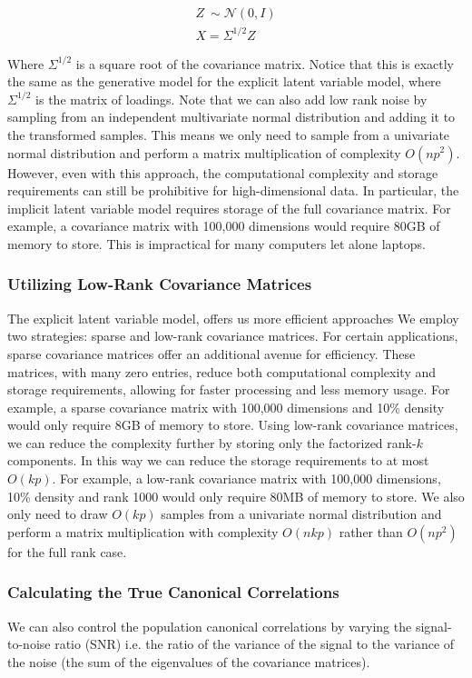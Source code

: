 \begin{align}
    Z~\sim \mathcal{N}(0, I) \\
    X = \Sigma^{1/2}Z
\end{align}

Where \( \Sigma^{1/2} \) is a square root of the covariance matrix.
Notice that this is exactly the same as the generative model for the explicit latent variable model, where \( \Sigma^{1/2} \) is the matrix of loadings.
Note that we can also add low rank noise by sampling from an independent multivariate normal distribution and adding it to the transformed samples.
This means we only need to sample from a univariate normal distribution and perform a matrix multiplication of complexity \(O(np^2)\).
However, even with this approach, the computational complexity and storage requirements can still be prohibitive for high-dimensional data.
In particular, the implicit latent variable model requires storage of the full covariance matrix.
For example, a covariance matrix with 100,000 dimensions would require 80GB of memory to store.
This is impractical for many computers let alone laptops.

\subsubsection{Utilizing Low-Rank Covariance Matrices}
The explicit latent variable model, offers us more efficient approaches
We employ two strategies: sparse and low-rank covariance matrices.
For certain applications, sparse covariance matrices offer an additional avenue for efficiency.
These matrices, with many zero entries, reduce both computational complexity and storage requirements, allowing for faster processing and less memory usage.
For example, a sparse covariance matrix with 100,000 dimensions and 10\% density would only require 8GB of memory to store.
Using low-rank covariance matrices, we can reduce the complexity further by storing only the factorized rank-$k$ components.
In this way we can reduce the storage requirements to at most \(O(kp)\).
For example, a low-rank covariance matrix with 100,000 dimensions, 10\% density and rank 1000 would only require 80MB of memory to store.
We also only need to draw \(O(kp)\) samples from a univariate normal distribution and perform a matrix multiplication with complexity \(O(nkp)\) rather than \(O(np^2)\) for the full rank case.

\subsubsection{Calculating the True Canonical Correlations}
We can also control the population canonical correlations by varying the signal-to-noise ratio (SNR) i.e. the ratio of the variance of the signal to the variance of the noise (the sum of the eigenvalues of the covariance matrices).

